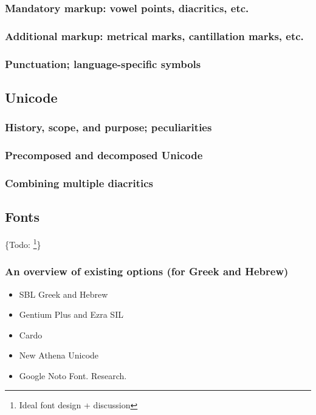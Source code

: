 \documentclass[11pt]{article}
\begin{document}
\subsubsection{Mandatory markup: vowel points, diacritics, etc.}
\label{sec:org8492339}

\subsubsection{Additional markup: metrical marks, cantillation marks, etc.}
\label{sec:orgc3a0639}

\subsubsection{Punctuation; language-specific symbols}
\label{sec:org1c38bb0}

\subsection{Unicode}
\label{sec:org9c1ce48}

\subsubsection{History, scope, and purpose; peculiarities}
\label{sec:org292087e}

\subsubsection{Precomposed and decomposed Unicode}
\label{sec:org492d6cd}

\subsubsection{Combining multiple diacritics}
\label{sec:orgca62515}

\subsection{Fonts}
\label{sec:orgd3db7c2}

\{Todo: \footnote{Ideal font design + discussion}\}

\subsubsection{An overview of existing options (for Greek and Hebrew)}
\label{sec:org0050b76}

\begin{itemize}
\item SBL Greek and Hebrew
\item Gentium Plus and Ezra SIL
\item Cardo
\item New Athena Unicode
\item Google Noto Font. Research.
\end{itemize}
\end{document}
